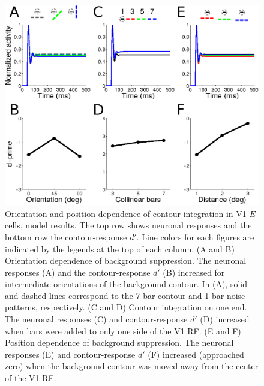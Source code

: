 \begin{figure}[t]
\begin{center}
\includegraphics[width=\textwidth]{Contour/figs/FigS2.eps}
\end{center}
\makeatletter
\let\@currsize\normalsize
\caption[Orientation and position dependence of contour integration in V1]{Orientation and position dependence of contour integration in
  V1 $E$ cells, model results. The top row shows neuronal responses
  and the bottom row the contour-response $d'$. Line colors for each
  figures are indicated by the legends at the top of each column. (A
  and B) Orientation dependence of background suppression. The
  neuronal responses (A) and the contour-response $d'$ (B) increased
  for intermediate orientations of the background contour.
  In (A), solid and
  dashed lines correspond to the 7-bar contour and 1-bar noise patterns, respectively.
  (C and D) Contour integration on one end. The neuronal responses (C)
  and contour-response $d'$ (D) increased when bars were added to only
  one side of the V1 RF. (E and F) Position dependence of background
  suppression.  The neuronal responses (E) and contour-response $d'$ (F) increased (approached zero) when the background contour was moved away from the center of the V1 RF.}
\label{Fig:V1_total}
\end{figure}

